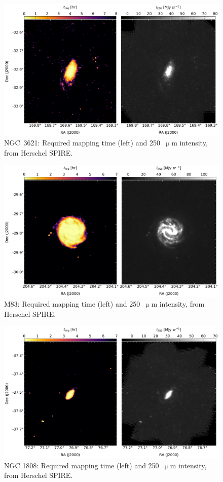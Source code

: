 \begin{figure}[!htbp]
\centering
\includegraphics[width=\textwidth]{figures/galaxies/ngc3621}
\caption[NGC 3621 required mapping time.]{NGC~3621: Required mapping time (left) and 250~$\upmu$m intensity, from Herschel SPIRE.}
\label{fig:ngc3621}
\end{figure}

\begin{figure}[!htbp]
\centering
\includegraphics[width=\textwidth]{figures/galaxies/m83}
\caption[M83 required mapping time.]{M83: Required mapping time (left) and 250~$\upmu$m intensity, from Herschel SPIRE.}
\label{fig:m83}
\end{figure}

\begin{figure}[!htbp]
\centering
\includegraphics[width=\textwidth]{figures/galaxies/ngc1808}
\caption[NGC 1808 required mapping time.]{NGC 1808: Required mapping time (left) and 250~$\upmu$m intensity, from Herschel SPIRE.}
\label{fig:ngc1808}
\end{figure}
